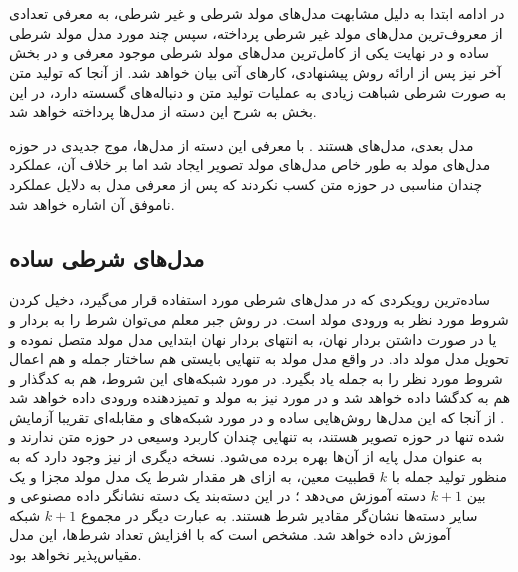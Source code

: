 \section{\condtg}
در ادامه ابتدا به دلیل مشابهت مدل‌های مولد شرطی و غیر شرطی، به معرفی تعدادی از معروف‌ترین مدل‌های مولد غیر شرطی پرداخته، سپس چند مورد مدل مولد شرطی ساده و در نهایت یکی از کامل‌ترین مدل‌های مولد شرطی موجود معرفی و در بخش آخر نیز پس از ارائه روش پیشنهادی، کارهای آتی بیان خواهد شد.
از آنجا که تولید متن به صورت شرطی شباهت زیادی به عملیات تولید متن و دنباله‌های گسسته دارد، در این بخش به شرح این دسته از مدل‌ها پرداخته خواهد شد.

مدل بعدی، مدل‌های  هستند \cite{vae-org}. با معرفی این دسته از مدل‌ها، موج جدیدی در حوزه مدل‌های مولد به طور خاص مدل‌های مولد تصویر ایجاد شد اما بر خلاف آن، عملکرد چندان مناسبی در حوزه متن کسب نکردند \cite{vae-text} که پس از معرفی مدل به دلایل عملکرد ناموفق آن اشاره خواهد شد.\\
\subsection{مدل‌های شرطی ساده}
ساده‌ترین رویکردی که در مدل‌های شرطی مورد استفاده قرار می‌گیرد، دخیل کردن شروط مورد نظر به ورودی مولد است. در روش جبر معلم می‌توان شرط را به بردار  و  یا در صورت داشتن بردار نهان، به انتهای بردار نهان ابتدایی مدل مولد متصل نموده و تحویل مدل مولد داد. در واقع مدل مولد به تنهایی بایستی هم ساختار جمله و هم اعمال شروط مورد نظر را به جمله یاد بگیرد. در مورد شبکه‌های \vae{} این شروط، هم به کدگذار و هم به کدگشا داده خواهد شد \cite{cvae} و در مورد\gan{} نیز به مولد و تمیزدهنده ورودی داده خواهد شد \cite{cgan}. از آنجا که این مدل‌ها روش‌هایی ساده و در مورد شبکه‌های \vae{} و مقابله‌ای تقریبا آزمایش شده تنها در حوزه تصویر هستند، به تنهایی چندان کاربرد وسیعی در حوزه متن ندارند و به عنوان مدل پایه از آن‌ها بهره برده ‌می‌شود. نسخه دیگری از \gan{} نیز وجود دارد که به منظور تولید جمله با $k$ قطبیت معین، به ازای هر مقدار شرط یک مدل مولد مجزا و یک  بین $k+1$ دسته آموزش می‌دهد \cite{sentigan}؛ در این دسته‌بند یک دسته نشانگر داده مصنوعی و سایر دسته‌ها نشان‌گر مقادیر شرط هستند. به عبارت دیگر در مجموع $k+1$ شبکه آموزش داده خواهد شد. مشخص است که با افزایش تعداد شرط‌ها، این مدل مقیاس‌پذیر نخواهد بود.
